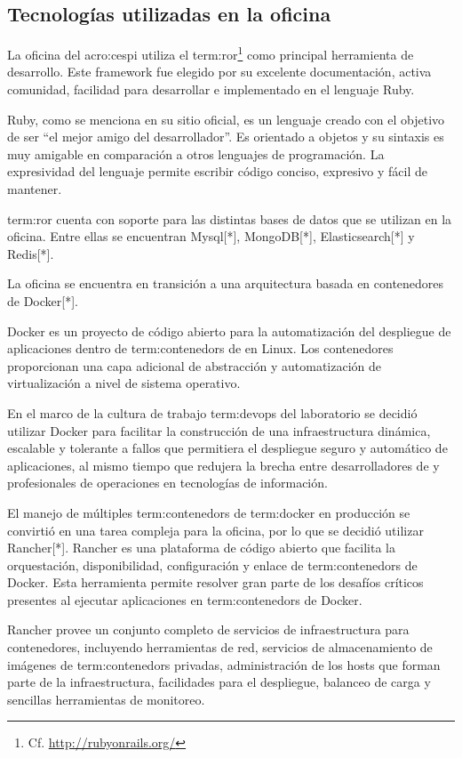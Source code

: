 \subsection{Tecnologías utilizadas en la oficina}
\label{tecnologias_utilizadas}

La oficina del \gls{acro:cespi} utiliza el  
\gls{term:ror}\footnote{Cf.  \url{http://rubyonrails.org/}} como principal herramienta
de desarrollo. Este framework fue elegido por su excelente documentación,
activa comunidad, facilidad para desarrollar e implementado en el lenguaje
Ruby.

Ruby, como se menciona en su sitio oficial, es un lenguaje creado con el
objetivo de ser “el mejor amigo del desarrollador”. Es orientado a objetos y su
sintaxis es muy amigable en comparación a otros lenguajes de programación. La
expresividad del lenguaje permite escribir código conciso, expresivo y fácil de
mantener.

\gls{term:ror} cuenta con soporte para las distintas bases de datos que se
utilizan en la oficina. Entre ellas se encuentran Mysql[*], MongoDB[*],
Elasticsearch[*] y Redis[*].

La oficina se encuentra en transición a una arquitectura basada en contenedores
de Docker[*].

Docker es un proyecto de código abierto para la automatización del despliegue
de aplicaciones dentro de \glspl{term:contenedor} de  en Linux. Los contenedores
proporcionan una capa adicional de abstracción y automatización de
virtualización a nivel de sistema operativo.

En el marco de la cultura de trabajo \gls{term:devops} del laboratorio se decidió utilizar
Docker para facilitar la construcción de una infraestructura dinámica,
escalable y tolerante a fallos que permitiera el despliegue seguro y automático
de aplicaciones, al mismo tiempo que redujera la brecha entre desarrolladores
de  y profesionales de operaciones en tecnologías de información.

El manejo de múltiples \glspl{term:contenedor} de \gls{term:docker} en producción se convirtió en una
tarea compleja para la oficina, por lo que se decidió utilizar Rancher[*].
Rancher es una plataforma de código abierto que facilita la orquestación,
disponibilidad, configuración y enlace de \glspl{term:contenedor} de Docker. Esta
herramienta permite resolver gran parte de los desafíos críticos presentes al
ejecutar aplicaciones en \glspl{term:contenedor} de Docker.

Rancher provee un conjunto completo de servicios de infraestructura para
contenedores, incluyendo herramientas de red, servicios de almacenamiento de
imágenes de \glspl{term:contenedor} privadas, administración de los hosts que forman parte
de la infraestructura, facilidades para el despliegue, balanceo de carga y
sencillas herramientas de monitoreo.
